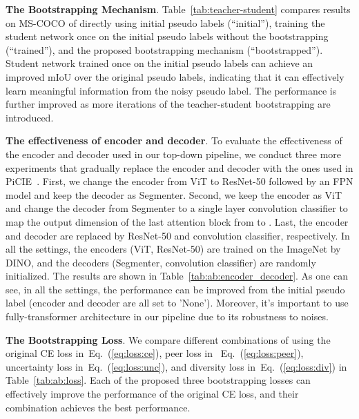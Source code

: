 \documentclass[runningheads]{llncs}
\newcommand{\PAR}[1]{\smallskip \noindent \textbf{#1}}
\newcommand{\tabref}[1]{Table~\ref{#1}}
\renewcommand{\eqref}[1]{Eq.~(\ref{#1})}
\begin{document}
\PAR{The Bootstrapping Mechanism}. \tabref{tab:teacher-student} compares results on MS-COCO of directly using initial pseudo labels (``initial''), training the student network once on the initial pseudo labels without the bootstrapping (``trained''), and the proposed bootstrapping mechanism (``bootstrapped''). Student network trained once on the initial pseudo labels can achieve an improved mIoU over the original pseudo labels, indicating that it can effectively learn meaningful information from the noisy pseudo label. The performance is further improved as more iterations of the teacher-student bootstrapping are introduced.


\PAR{The effectiveness of encoder and decoder}. To evaluate the effectiveness of the encoder and decoder used in our top-down pipeline, we conduct three more experiments that gradually replace the encoder and decoder with the ones used in PiCIE~\cite{PiCIE}. First, we change the encoder from ViT to ResNet-50 followed by an FPN model and keep the decoder as Segmenter. Second, we keep the encoder as ViT and change the decoder from Segmenter to a single layer convolution classifier to map the output dimension of the last attention block from  to . Last, the encoder and decoder are replaced by ResNet-50 and convolution classifier, respectively. In all the settings, the encoders (ViT, ResNet-50) are trained on the ImageNet by DINO, and the decoders (Segmenter, convolution classifier) are randomly initialized. The results are shown in \tabref{tab:ab:encoder_decoder}. As one can see, in all the settings, the performance can be improved from the initial pseudo label (encoder and decoder are all set to 'None'). Moreover, it's important to use fully-transformer architecture in our pipeline due to its robustness to noises.





\PAR{The Bootstrapping Loss}. We compare different combinations of using the original CE loss in~\eqref{eq:loss:ce}, peer loss in ~\eqref{eq:loss:peer}, uncertainty loss in~\eqref{eq:loss:unc}, and diversity loss in~\eqref{eq:loss:div} in \tabref{tab:ab:loss}. Each of the proposed three bootstrapping losses can effectively improve the performance of the original CE loss, and their combination achieves the best performance. 
\end{document}
